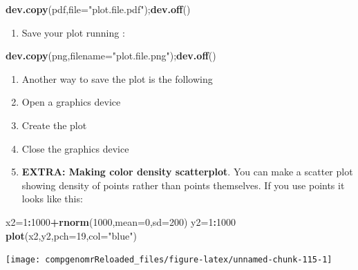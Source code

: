 \documentclass[12pt,]{krantz}
\newenvironment{Shaded}{\begin{snugshade}}{\end{snugshade}}
\newcommand{\DataTypeTok}[1]{\textcolor[rgb]{0.13,0.29,0.53}{#1}}
\newcommand{\DecValTok}[1]{\textcolor[rgb]{0.00,0.00,0.81}{#1}}
\newcommand{\KeywordTok}[1]{\textcolor[rgb]{0.13,0.29,0.53}{\textbf{#1}}}
\newcommand{\NormalTok}[1]{#1}
\newcommand{\OperatorTok}[1]{\textcolor[rgb]{0.81,0.36,0.00}{\textbf{#1}}}
\newcommand{\StringTok}[1]{\textcolor[rgb]{0.31,0.60,0.02}{#1}}
\providecommand{\tightlist}{%
  \setlength{\itemsep}{0pt}\setlength{\parskip}{0pt}}
\theoremstyle{definition}
\theoremstyle{definition}
\theoremstyle{definition}
\theoremstyle{remark}
\begin{document}
\begin{Shaded}
\begin{Highlighting}[]
\KeywordTok{dev.copy}\NormalTok{(pdf,}\DataTypeTok{file=}\StringTok{"plot.file.pdf"}\NormalTok{);}\KeywordTok{dev.off}\NormalTok{()}
\end{Highlighting}
\end{Shaded}

\begin{enumerate}
\def\labelenumi{\arabic{enumi}.}
\setcounter{enumi}{43}
\tightlist
\item
  Save your plot running :
\end{enumerate}

\begin{Shaded}
\begin{Highlighting}[]
\KeywordTok{dev.copy}\NormalTok{(png,}\DataTypeTok{filename=}\StringTok{"plot.file.png"}\NormalTok{);}\KeywordTok{dev.off}\NormalTok{()}
\end{Highlighting}
\end{Shaded}

\begin{enumerate}
\def\labelenumi{\arabic{enumi}.}
\setcounter{enumi}{43}
\item
  Another way to save the plot is the following
\item
  Open a graphics device
\item
  Create the plot
\item
  Close the graphics device
\item
  \textbf{EXTRA: Making color density scatterplot}. You can make a
  scatter plot showing density of points rather than points themselves.
  If you use points it looks like this:
\end{enumerate}

\begin{Shaded}
\begin{Highlighting}[]
\NormalTok{x2=}\DecValTok{1}\OperatorTok{:}\DecValTok{1000}\OperatorTok{+}\KeywordTok{rnorm}\NormalTok{(}\DecValTok{1000}\NormalTok{,}\DataTypeTok{mean=}\DecValTok{0}\NormalTok{,}\DataTypeTok{sd=}\DecValTok{200}\NormalTok{)}
\NormalTok{y2=}\DecValTok{1}\OperatorTok{:}\DecValTok{1000}
\KeywordTok{plot}\NormalTok{(x2,y2,}\DataTypeTok{pch=}\DecValTok{19}\NormalTok{,}\DataTypeTok{col=}\StringTok{"blue"}\NormalTok{)}
\end{Highlighting}
\end{Shaded}

\begin{center}\texttt{[image: compgenomrReloaded\_files/figure-latex/unnamed-chunk-115-1]} \end{center}
\end{document}
